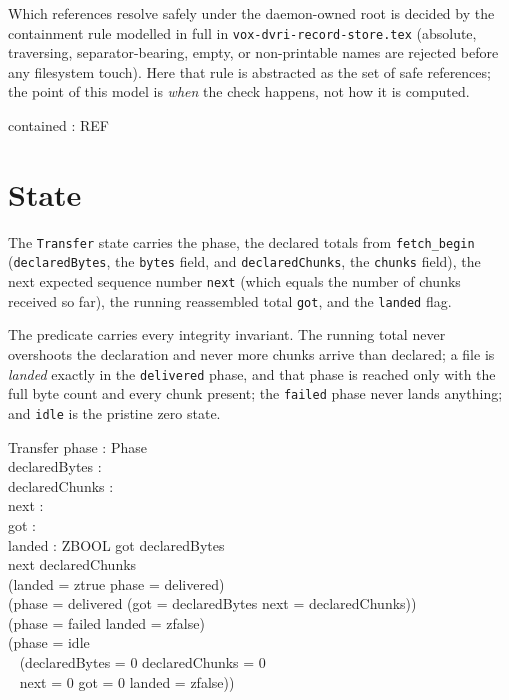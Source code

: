 \documentclass[a4paper,10pt,fleqn]{article}
\begin{document}
Which references resolve safely under the daemon-owned root is decided by the
containment rule modelled in full in \texttt{vox-dvri-record-store.tex} (absolute,
traversing, separator-bearing, empty, or non-printable names are rejected before
any filesystem touch). Here that rule is abstracted as the set of safe
references; the point of this model is \emph{when} the check happens, not how it
is computed.

\begin{axdef}
  contained : \power REF
\end{axdef}

\section{State}
\label{sec:state}

The \texttt{Transfer} state carries the phase, the declared totals from
\texttt{fetch\_begin} (\texttt{declaredBytes}, the \texttt{bytes} field, and
\texttt{declaredChunks}, the \texttt{chunks} field), the next expected sequence
number \texttt{next} (which equals the number of chunks received so far), the
running reassembled total \texttt{got}, and the \texttt{landed} flag.

The predicate carries every integrity invariant. The running total never
overshoots the declaration and never more chunks arrive than declared; a file is
\emph{landed} exactly in the \texttt{delivered} phase, and that phase is reached
only with the full byte count and every chunk present; the \texttt{failed} phase
never lands anything; and \texttt{idle} is the pristine zero state.

\begin{schema}{Transfer}
  phase : Phase \\
  declaredBytes : \nat \\
  declaredChunks : \nat \\
  next : \nat \\
  got : \nat \\
  landed : ZBOOL
  \where
  got \leq declaredBytes \\
  next \leq declaredChunks \\
  (landed = ztrue \iff phase = delivered) \\
  (phase = delivered \implies (got = declaredBytes \land next = declaredChunks)) \\
  (phase = failed \implies landed = zfalse) \\
  (phase = idle \implies \\
  \quad~ (declaredBytes = 0 \land declaredChunks = 0 \\
  \quad~ \land next = 0 \land got = 0 \land landed = zfalse))
\end{schema}
\end{document}
